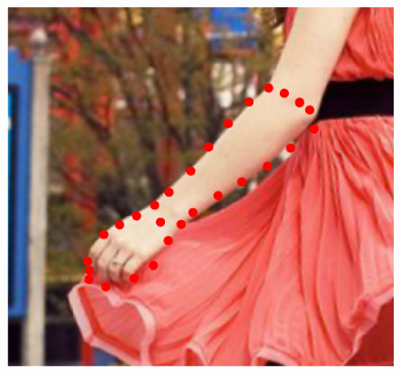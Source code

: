 \begin{figure}[!t]
    \includegraphics[height=\ofh]{resources/Annotation_Correction/Fittings/21.eps}
    \hfill

\end{figure}
